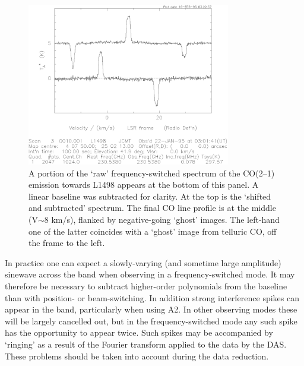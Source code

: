 \documentclass[11pt,twoside]{article}
\begin{document}
\begin{figure}[htb]
\centering
\includegraphics[width=3.5in]{sc8_fsw_reduction.ps}
\vspace*{-0.5cm}
\begin{center}
\begin{minipage}[t]{5.5in}
\caption[Reducing frequency-switched data]
{\small{A portion of the `raw' frequency-switched spectrum of the CO(2--1)
emission towards L1498 appears at the bottom of this panel. A linear baseline
was subtracted for clarity. At the top is the `shifted and subtracted'
spectrum. The final CO line profile is at the middle (V$\sim 8$ km/s), flanked
by negative-going `ghost' images. The left-hand one of the latter coincides
with a `ghost' image from telluric CO, off the frame to the left. 
}}
\label{fig:fsw_reduction}
\end{minipage}
\end{center}
\end{figure}

In practice one can expect a slowly-varying (and sometime large
amplitude) sinewave across the band when observing in a
frequency-switched mode. It may therefore be necessary to subtract
higher-order polynomials from the baseline than with position- or
beam-switching. In addition strong interference spikes can appear in
the band, particularly when using A2. In other observing modes these
will be largely cancelled out, but in the frequency-switched mode any
such spike has the opportunity to appear twice. Such spikes may be
accompanied by `ringing' as a result of the Fourier transform applied
to the data by the DAS. These problems should be taken into account
during the data reduction.
\end{document}
